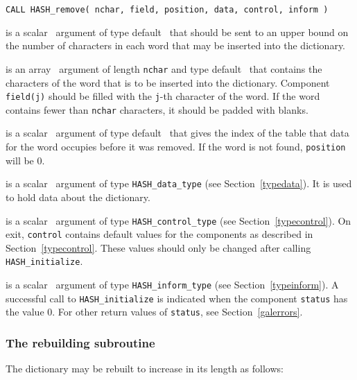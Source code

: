 \documentclass{galahad}
\newcommand{\packagename}{HASH}
\begin{document}
\hspace{8mm}
{\tt CALL \packagename\_remove( nchar, field, position, data, control, inform )}

\vspace*{-2mm}
\begin{description}

 is a scalar \intentin\ argument of type default \integer\ that
should be sent to an upper bound on the number of characters in each
word that may be inserted into the dictionary.

 is an array \intentin\ argument of length {\tt nchar} and 
type default \character\ that contains the characters of the word that 
is to be inserted into the dictionary.  
Component {\tt field(j)} should be filled with the {\tt j}-th 
character of the word. If the word contains fewer than {\tt nchar} characters,
it should be padded with blanks.

 is a scalar \intentout\ argument of type default \integer\ that
gives the index of the table that data for the word occupies before it was
removed. If the word is not found, {\tt position} will be 0.

 is a scalar \intentinout\ argument of type
{\tt \packagename\_data\_type}
(see Section~\ref{typedata}). It is used to hold data about the dictionary.

 is a scalar \intentin\ argument of type
{\tt \packagename\_control\_type}
(see Section~\ref{typecontrol}).
On exit, {\tt control} contains default values for the components as
described in Section~\ref{typecontrol}.
These values should only be changed after calling
{\tt \packagename\_initialize}.

 is a scalar \intentinout\ argument of type
{\tt \packagename\_inform\_type}
(see Section~\ref{typeinform}). A successful call to
{\tt \packagename\_initialize}
is indicated when the  component {\tt status} has the value 0.
For other return values of {\tt status}, see Section~\ref{galerrors}.

\end{description}


\subsubsection{The rebuilding subroutine}\label{subrebuild}
The dictionary may be rebuilt to increase in its length as follows:
\vspace*{1mm}
\end{document}
